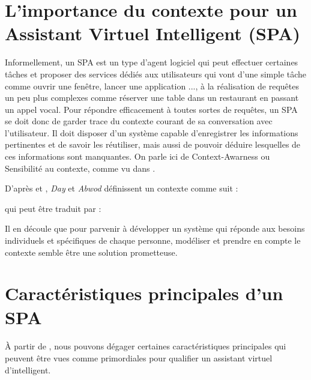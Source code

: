 \section{L'importance du contexte pour un Assistant Virtuel Intelligent  (SPA)}\label{spa-def}
Informellement, un SPA est un type d'agent logiciel qui peut effectuer certaines tâches et proposer des services dédiés aux utilisateurs qui vont d'une simple tâche comme ouvrir une fenêtre, lancer une application ..., à la réalisation de requêtes un peu plus complexes comme réserver une table dans un restaurant en passant un appel vocal. Pour répondre efficacement à toutes sortes de requêtes, un SPA se doit donc de garder trace du contexte courant de sa conversation avec l'utilisateur. Il doit disposer d'un système capable d'enregistrer les informations pertinentes et de savoir les réutiliser, mais aussi de pouvoir déduire lesquelles de ces informations sont manquantes. On parle ici de Context-Awarness ou Sensibilité au contexte, comme vu dans \citep{SPA-overview}.
\par D'après \citep{SPA-overview} et \citep{dey-abwod},
\textit{Day} et \textit{Abwod} définissent un contexte comme suit : 
\begin{quote}\label{context-def}
\end{quote}
qui peut être traduit par :
\begin{quote}\label{context-def-fr}
\end{quote}
Il en découle que pour parvenir à développer un système qui réponde aux besoins individuels et spécifiques de chaque personne, modéliser et prendre en compte le contexte semble être une solution prometteuse.



\section{Caractéristiques principales d'un SPA}
\paragraph{}
À partir de \citep{SPA-overview}, nous pouvons dégager certaines caractéristiques principales qui peuvent être vues comme primordiales pour qualifier un assistant virtuel d'intelligent.
